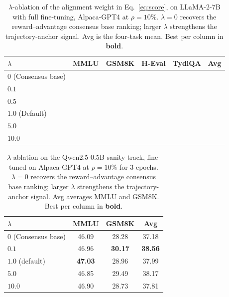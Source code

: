 \begin{table}[t]
\centering
\caption{$\lambda$-ablation of the alignment weight in
Eq.~\ref{eq:score}, on LLaMA-2-7B with full fine-tuning, Alpaca-GPT4
at $\rho=10\%$. $\lambda=0$ recovers the reward--advantage consensus
base ranking; larger $\lambda$ strengthens the trajectory-anchor
signal. Avg is the four-task mean. Best per column in
\textbf{bold}.}
\label{tab:lambda-7b}
\begin{tabular}{lccccc}
\toprule
$\lambda$ & MMLU & GSM8K & H-Eval & TydiQA & Avg \\
\midrule
$0$ (Consensus base) & \STATUS{??.??} & \STATUS{??.??} & \STATUS{??.??} & \STATUS{??.??} & \STATUS{??.??} \\
$0.1$               & \STATUS{??.??} & \STATUS{??.??} & \STATUS{??.??} & \STATUS{??.??} & \STATUS{??.??} \\
$0.5$               & \STATUS{??.??} & \STATUS{??.??} & \STATUS{??.??} & \STATUS{??.??} & \STATUS{??.??} \\
$1.0$ (Default)     & \STATUS{??.??} & \STATUS{??.??} & \STATUS{??.??} & \STATUS{??.??} & \STATUS{??.??} \\
$5.0$               & \STATUS{??.??} & \STATUS{??.??} & \STATUS{??.??} & \STATUS{??.??} & \STATUS{??.??} \\
$10.0$              & \STATUS{??.??} & \STATUS{??.??} & \STATUS{??.??} & \STATUS{??.??} & \STATUS{??.??} \\
\bottomrule
\end{tabular}
\end{table}

\begin{table}[t]
\centering
\caption{$\lambda$-ablation on the Qwen2.5-0.5B sanity track,
fine-tuned on Alpaca-GPT4 at $\rho=10\%$ for 3 epochs.
$\lambda=0$ recovers the reward--advantage consensus base ranking;
larger $\lambda$ strengthens the trajectory-anchor signal. Avg
averages MMLU and GSM8K. Best per column in \textbf{bold}.}
\label{tab:lambda-05b}
\begin{tabular}{lccc}
\toprule
$\lambda$ & MMLU & GSM8K & Avg \\
\midrule
$0$ (Consensus base) & 46.09 & 28.28 & 37.18 \\
$0.1$                & 46.96 & \textbf{30.17} & \textbf{38.56} \\
$1.0$ (default)      & \textbf{47.03} & 28.96 & 37.99 \\
$5.0$                & 46.85 & 29.49 & 38.17 \\
$10.0$               & 46.90 & 28.73 & 37.81 \\
\bottomrule
\end{tabular}
\end{table}

